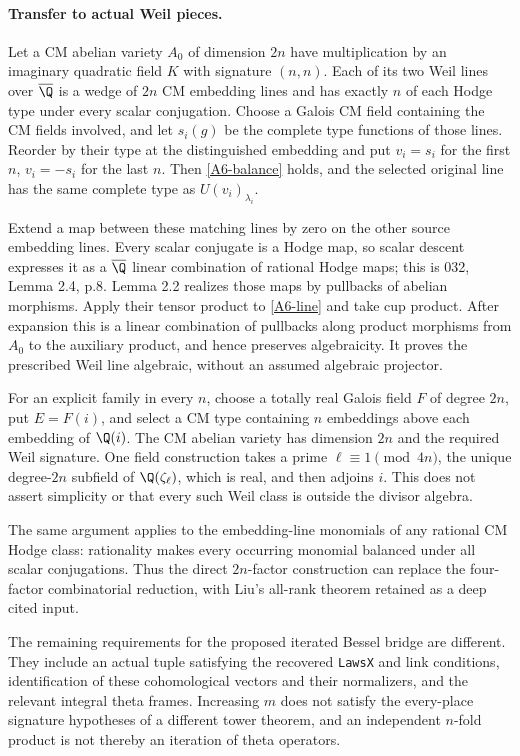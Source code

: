 \paragraph{Transfer to actual Weil pieces.}
Let a CM abelian variety $A_0$ of dimension $2n$ have multiplication
by an imaginary quadratic field $K$ with signature $(n,n)$.
Each of its two Weil lines over $\overline\Q$ is a wedge of
$2n$ CM embedding lines and has exactly $n$ of each Hodge type
under every scalar conjugation. Choose a Galois CM field containing
the CM fields involved, and let $s_i(g)$ be the complete type
functions of those lines. Reorder by their type at the distinguished
embedding and put $v_i=s_i$ for the first $n$, $v_i=-s_i$ for the
last $n$. Then \eqref{A6-balance} holds, and the selected original
line has the same complete type as $U(v_i)_{\lambda_i}$.

Extend a map between these matching lines by zero on the other
source embedding lines. Every scalar conjugate is a Hodge map,
so scalar descent expresses it as a $\overline\Q$ linear
combination of rational Hodge maps; this is 032, Lemma 2.4, p.8.
Lemma 2.2 realizes those maps by pullbacks of abelian morphisms.
Apply their tensor product to \eqref{A6-line} and take cup product.
After expansion this is a linear combination of pullbacks along
product morphisms from $A_0$ to the auxiliary product, and hence
preserves algebraicity. It proves the prescribed Weil line
algebraic, without an assumed algebraic projector.

For an explicit family in every $n$, choose a totally real Galois
field $F$ of degree $2n$, put $E=F(i)$, and select a CM type
containing $n$ embeddings above each embedding of $\Q(i)$.
The CM abelian variety has dimension $2n$ and the required Weil
signature. One field construction takes a prime
$\ell\equiv1\pmod{4n}$, the unique degree-$2n$ subfield of
$\Q(\zeta_\ell)$, which is real, and then adjoins $i$.
This does not assert simplicity or that every such Weil class is
outside the divisor algebra.

The same argument applies to the embedding-line monomials of any
rational CM Hodge class: rationality makes every occurring monomial
balanced under all scalar conjugations. Thus the direct
$2n$-factor construction can replace the four-factor combinatorial
reduction, with Liu's all-rank theorem retained as a deep cited input.

The remaining requirements for the proposed iterated Bessel bridge
are different. They include an actual tuple satisfying the recovered
\texttt{LawsX} and link conditions, identification of these
cohomological vectors and their normalizers, and the relevant
integral theta frames. Increasing $m$ does not satisfy the
every-place signature hypotheses of a different tower theorem,
and an independent $n$-fold product is not thereby an iteration
of theta operators.
